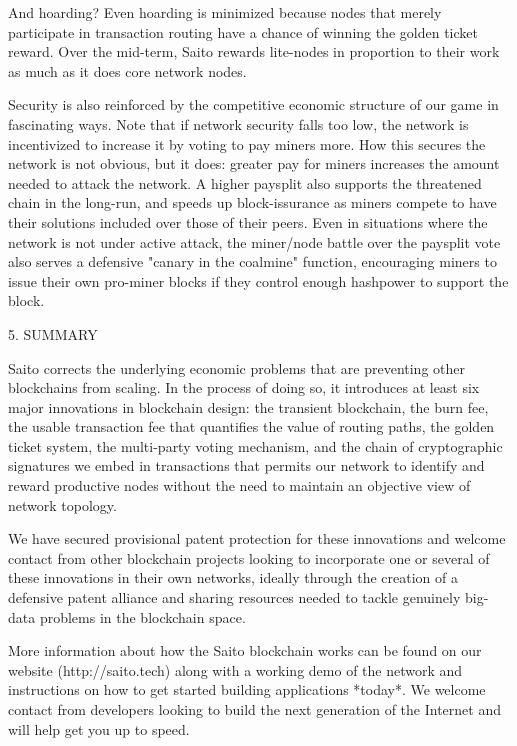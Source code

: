 \documentclass[12pt, oneside]{article}   	%
\begin{document}
\begin{multicols}{2}
And hoarding? Even hoarding is minimized because nodes that merely participate in transaction routing have a chance of winning the golden ticket reward. Over the mid-term, Saito rewards lite-nodes in proportion to their work as much as it does core network nodes.

Security is also reinforced by the competitive economic structure of our game in fascinating ways. Note that if network security falls too low, the network is incentivized to increase it by voting to pay miners more. How this secures the network is not obvious, but it does: greater pay for miners increases the amount needed to attack the network. A higher paysplit also supports the threatened chain in the long-run, and speeds up block-issurance as miners compete to have their solutions included over those of their peers. Even in situations where the network is not under active attack, the miner/node battle over the paysplit vote also serves a defensive "canary in the coalmine" function, encouraging miners to issue their own pro-miner blocks if they control enough hashpower to support the block.

5. SUMMARY

Saito corrects the underlying economic problems that are preventing other blockchains from scaling. In the process of doing so, it introduces at least six major innovations in blockchain design: the transient blockchain, the burn fee, the usable transaction fee that quantifies the value of routing paths, the golden ticket system, the multi-party voting mechanism, and the chain of cryptographic signatures we embed in transactions that permits our network to identify and reward productive nodes without the need to maintain an objective view of network topology.  

We have secured provisional patent protection for these innovations and welcome contact from other blockchain projects looking to incorporate one or several of these innovations in their own networks, ideally through the creation of a defensive patent alliance and sharing resources needed to tackle genuinely big-data problems in the blockchain space.

More information about how the Saito blockchain works can be found on our website (http://saito.tech) along with a working demo of the network and instructions on how to get started building applications *today*. We welcome contact from developers looking to build the next generation of the Internet and will help get you up to speed.



\end{multicols}
 
\end{document}
